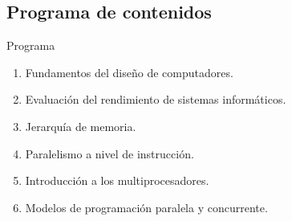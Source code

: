 \subsection{Programa de contenidos}

\begin{frame}[t]{Programa}
\begin{enumerate}
  \item Fundamentos del diseño de computadores.
  \item Evaluación del rendimiento de sistemas informáticos.
  \item Jerarquía de memoria.
  \item Paralelismo a nivel de instrucción. 
  \item Introducción a los multiprocesadores.
  \item Modelos de programación paralela y concurrente.
\end{enumerate}
\end{frame}
